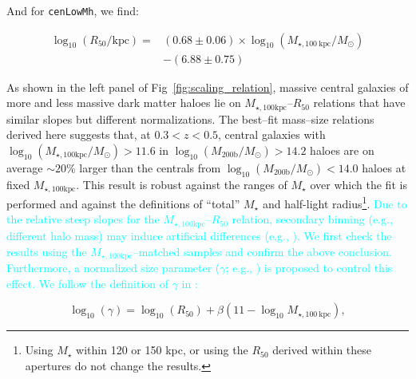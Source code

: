 \documentclass[a4paper,fleqn,usenatbib]{mnras}
\def\nbcg{\texttt{cenLowMh}}
\def\mstar{{$M_{\star}$}}
\def\logmhalo{{$\log_{10} (M_{\mathrm{200b}}/M_{\odot})$}}
\def\mtot{{$M_{\star,100\mathrm{kpc}}$}}
\def\logmtot{{$\log_{10} (M_{\star,100\mathrm{kpc}}/M_{\odot})$}}
\newcommand{\song}[1]{\textcolor{cyan}{#1}}
\begin{document}
    \noindent And for \nbcg{}, we find:
    
    \begin{equation}
        \begin{aligned}
        \log_{10} (R_{\mathrm{50}}/\mathrm{kpc}) = & (0.68\pm0.06) \times \log_{10} (M_{\star, 100\ \mathrm{kpc}}/M_{\odot}) \\ & -(6.88\pm0.75)
        \end{aligned}
    \end{equation}
    
    \noindent As shown in the left panel of Fig~\ref{fig:scaling_relation}, 
    massive central galaxies of more and less massive dark matter haloes lie on 
    \mtot{}--$R_{\mathrm{50}}$ relations that have similar slopes but 
    different normalizations. 
    The best--fit mass--size relations derived here suggests that, 
    at $0.3 < z < 0.5$, central galaxies with \logmtot{}$>11.6$ in \logmhalo{}$>14.2$
    haloes are on average $\sim20$\% larger than the centrals from \logmhalo{}$<14.0$
    haloes at fixed \mtot{}.
    This result is robust against the ranges of \mstar{} over which the fit is 
    performed and against the definitions of  ``total'' \mstar{} and half-light 
    radius\footnote{Using \mstar{} within 120 or 150 kpc, or using the 
    $R_{\mathrm{50}}$ derived within these apertures do not change the results.}. 
    \song{
    Due to the relative steep slopes for the \mtot{}--$R_{\mathrm{50}}$ relation, 
    secondary binning (e.g., different halo mass) may induce artificial differences
    (e.g., \citealt{Sonnenfeld2017}). 
    We first check the results using the \mtot{}--matched samples and confirm 
    the above conclusion. 
    Furthermore, a normalized size parameter ($\gamma$; e.g., \citealt{Newman2012, 
    HCompany13}) is proposed to control this effect. 
    We follow the definition of $\gamma$ in \citet{HCompany13}:
    }
    
    \begin{equation}
        \log_{10}(\gamma) = \log_{10} (R_{\mathrm{50}}) + \beta (11 - \log_{10}M_{\star, 100\ \mathrm{kpc}}),
    \end{equation}
    
\end{document}
